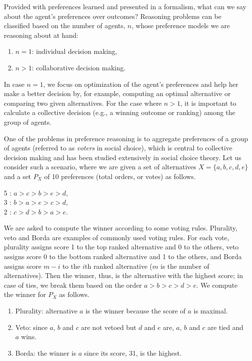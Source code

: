 Provided with preferences learned and presented in a formalism,
what can we say about the agent's preferences over outcomes?
Reasoning problems can be classified
based on the number of agents, $n$, whose preference models we
are reasoning about at hand:
\begin{enumerate} \itemsep -4pt
	\item $n=1$: individual decision making,
	\item $n>1$: collaborative decision making.
\end{enumerate}
In case $n=1$, we focus on optimization of the agent's preferences and
help her make a better decision by, for example, computing an optimal
alternative or comparing two given alternatives.  For the case
where $n>1$, it is important to calculate
a collective decision (e.g., a winning outcome or ranking)
among the group of agents.

One of the problems in preference reasoning is to
aggregate preferences of a group of
agents (referred
to as \emph{voters} in social choice), which is central to collective decision making and has been studied
extensively in social choice theory. 
Let us consider such a scenario, where we are
given a set of alternatives $X = \{ a,b,c,d,e \}$ and a set $P_X$ of 10 
preferences (total orders, or votes) as follows.
	\begin{center}
		5 : $a > c > b > e > d$,\\
		3 : $b > a > e > c > d$,\\
		2 : $c > d > b > a > e$.
	\end{center}
	
	We are asked to compute the winner according to some voting rules. 
	Plurality, veto and Borda are examples of commonly used voting rules.
	For each vote, plurality assigns score 1 to the top ranked alternative
	and 0 to the others, veto assigns score 0 to the bottom ranked alternative
	and 1 to the others, and Borda assigns score $m-i$ to the $i$th ranked 
	alternative ($m$ is the number of alternatives).
	Then the winner, thus, is the alternative with the highest score; in case of
	ties, we break them based on the order $a > b > c > d > e$.
	We compute the winner for $P_X$ as follows.
	
	\begin{enumerate}  \itemsep -4pt
		\item Plurality: alternative $a$ is the winner because the score of $a$ is maximal.
		\item Veto: since $a$, $b$ and $c$ are not vetoed but $d$ and $e$ are, 
					$a$, $b$ and $c$ are tied and $a$ wins.
		\item Borda: the winner is $a$ since its score, 31, is the highest.
	\end{enumerate}


